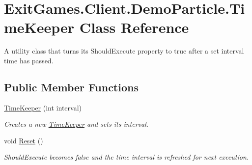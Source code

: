 \hypertarget{class_exit_games_1_1_client_1_1_demo_particle_1_1_time_keeper}{}\section{Exit\+Games.\+Client.\+Demo\+Particle.\+Time\+Keeper Class Reference}
\label{class_exit_games_1_1_client_1_1_demo_particle_1_1_time_keeper}


A utility class that turns it\textquotesingle{}s Should\+Execute property to true after a set interval time has passed.  


\subsection*{Public Member Functions}
\begin{DoxyCompactItemize}
\item 
\hyperlink{class_exit_games_1_1_client_1_1_demo_particle_1_1_time_keeper_a4290da682c42ba1388fecb7000148512}{Time\+Keeper} (int interval)
\begin{DoxyCompactList}\small\item\em Creates a new \hyperlink{class_exit_games_1_1_client_1_1_demo_particle_1_1_time_keeper}{Time\+Keeper} and sets it\textquotesingle{}s interval. \end{DoxyCompactList}\item 
void \hyperlink{class_exit_games_1_1_client_1_1_demo_particle_1_1_time_keeper_a8ec9eb2bd19237afc5089abe75784841}{Reset} ()
\begin{DoxyCompactList}\small\item\em Should\+Execute becomes false and the time interval is refreshed for next execution. \end{DoxyCompactList}\end{DoxyCompactItemize}
